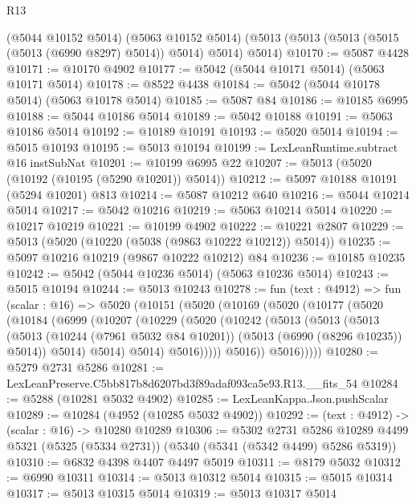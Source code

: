 \begin{lexlean}{R13}
\begin{coremodule}
    (@5044 @10152 @5014)
    (@5063 @10152 @5014)
    (@5013 (@5013 (@5013 (@5015 (@5013 (@6990 @8297) @5014)) @5014) @5014) @5014)
@10170 := @5087 @4428
@10171 := @10170 @4902
@10177 := @5042 (@5044 @10171 @5014) (@5063 @10171 @5014)
@10178 := @8522 @4438
@10184 := @5042 (@5044 @10178 @5014) (@5063 @10178 @5014)
@10185 := @5087 @84
@10186 := @10185 @6995
@10188 := @5044 @10186 @5014
@10189 := @5042 @10188
@10191 := @5063 @10186 @5014
@10192 := @10189 @10191
@10193 := @5020 @5014
@10194 := @5015 @10193
@10195 := @5013 @10194
@10199 := LexLeanRuntime.subtract @16 instSubNat
@10201 := @10199 @6995 @22
@10207 := @5013 (@5020 (@10192 (@10195 (@5290 @10201)) @5014))
@10212 := @5097 @10188 @10191 (@5294 @10201) @813
@10214 := @5087 @10212 @640
@10216 := @5044 @10214 @5014
@10217 := @5042 @10216
@10219 := @5063 @10214 @5014
@10220 := @10217 @10219
@10221 := @10199 @4902
@10222 := @10221 @2807
@10229 := @5013 (@5020 (@10220 (@5038 (@9863 @10222 @10212)) @5014))
@10235 := @5097 @10216 @10219 (@9867 @10222 @10212) @84
@10236 := @10185 @10235
@10242 := @5042 (@5044 @10236 @5014) (@5063 @10236 @5014)
@10243 := @5015 @10194
@10244 := @5013 @10243
@10278 := fun (text : @4912) =>
  fun (scalar : @16) =>
  @5020
    (@10151
      (@5020
        (@10169
          (@5020
            (@10177
              (@5020
                (@10184
                  (@6999
                    (@10207
                      (@10229
                        (@5020
                          (@10242
                            (@5013
                              (@5013
                                (@5013
                                  (@5013
                                    (@10244 (@7961 @5032 @84 @10201))
                                    (@5013 (@6990 (@8296 @10235)) @5014))
                                  @5014)
                                @5014)
                              @5014)
                            @5016)))))
                  @5016))
              @5016)))))
@10280 := @5279 @2731 @5286
@10281 := LexLeanPreserve.C5bb817b8d6207bd3f89adaf093ca5e93.R13.__fits_54
@10284 := @5288 (@10281 @5032 @4902)
@10285 := LexLeanKappa.Json.pushScalar
@10289 := @10284 (@4952 (@10285 @5032 @4902))
@10292 := (text : @4912) -> (scalar : @16) -> @10280 @10289
@10306 := @5302
    @2731
    @5286
    @10289
    @4499
    @5321
    (@5325 (@5334 @2731))
    (@5340 (@5341 (@5342 @4499) @5286 @5319))
@10310 := @6832 @4398 @4407 @4497 @5019
@10311 := @8179 @5032
@10312 := @6990 @10311
@10314 := @5013 @10312 @5014
@10315 := @5015 @10314
@10317 := @5013 @10315 @5014
@10319 := @5013 @10317 @5014

\end{coremodule}
\end{lexlean}
